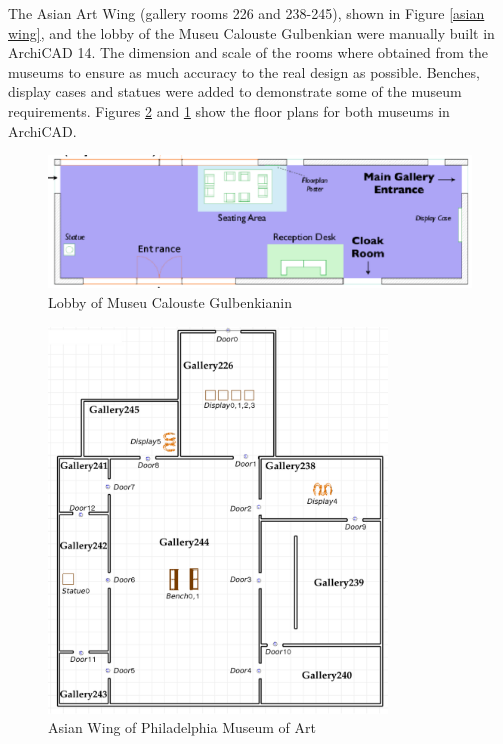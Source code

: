 \documentclass[12pt]{ucthesis}
\begin{document}
The Asian Art Wing (gallery rooms 226 and 238-245), shown in Figure \ref{asian wing}, and the lobby of the Museu Calouste Gulbenkian were manually built in ArchiCAD 14. The dimension and scale of the rooms where obtained from the museums to ensure as much accuracy to the real design as possible. Benches, display cases and statues were added to demonstrate some of the museum requirements. Figures \ref{philadelphia-museum-floorplan} and \ref{lobby} show the floor plans for both museums in ArchiCAD.

\pagebreak

\begin{figure}[H]
\centering
\includegraphics[width=120mm]{lobby}
\caption{Lobby of Museu Calouste Gulbenkianin}
\label{lobby}
\end{figure}

\begin{figure}[H]
\centering
\includegraphics[width=90mm]{museum-floor-plan-reqs-p}
\caption{Asian Wing of Philadelphia Museum of Art}
\label{philadelphia-museum-floorplan}
\end{figure}
\end{document}
